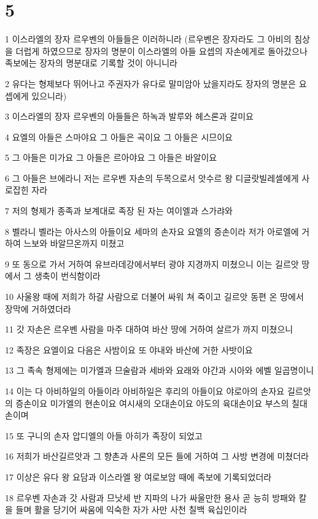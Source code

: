 \chapter{5}

\par 1 이스라엘의 장자 르우벤의 아들들은 이러하니라 (르우벤은 장자라도 그 아비의 침상을 더럽게 하였으므로 장자의 명분이 이스라엘의 아들 요셉의 자손에게로 돌아갔으나 족보에는 장자의 명분대로 기록할 것이 아니니라
\par 2 유다는 형제보다 뛰어나고 주권자가 유다로 말미암아 났을지라도 장자의 명분은 요셉에게 있으니라)
\par 3 이스라엘의 장자 르우벤의 아들들은 하녹과 발루와 헤스론과 갈미요
\par 4 요엘의 아들은 스마야요 그 아들은 곡이요 그 아들은 시므이요
\par 5 그 아들은 미가요 그 아들은 르아야요 그 아들은 바알이요
\par 6 그 아들은 브에라니 저는 르우벤 자손의 두목으로서 앗수르 왕 디글랏빌레셀에게 사로잡힌 자라
\par 7 저의 형제가 종족과 보계대로 족장 된 자는 여이엘과 스가랴와
\par 8 벨라니 벨라는 아사스의 아들이요 세마의 손자요 요엘의 증손이라 저가 아로엘에 거하여 느보와 바알므온까지 미쳤고
\par 9 또 동으로 가서 거하여 유브라데강에서부터 광야 지경까지 미쳤으니 이는 길르앗 땅에서 그 생축이 번식함이라
\par 10 사울왕 때에 저희가 하갈 사람으로 더불어 싸워 쳐 죽이고 길르앗 동편 온 땅에서 장막에 거하였더라
\par 11 갓 자손은 르우벤 사람을 마주 대하여 바산 땅에 거하여 살르가 까지 미쳤으니
\par 12 족장은 요엘이요 다음은 사밤이요 또 야내와 바산에 거한 사밧이요
\par 13 그 족속 형제에는 미가엘과 므술람과 세바와 요래와 야간과 시아와 에벨 일곱명이니
\par 14 이는 다 아비하일의 아들이라 아비하일은 후리의 아들이요 야로아의 손자요 길르앗의 증손이요 미가엘의 현손이요 여시새의 오대손이요 야도의 육대손이요 부스의 칠대손이며
\par 15 또 구니의 손자 압디엘의 아들 아히가 족장이 되었고
\par 16 저희가 바산길르앗과 그 향촌과 사론의 모든 들에 거하여 그 사방 변경에 미쳤더라
\par 17 이상은 유다 왕 요담과 이스라엘 왕 여로보암 때에 족보에 기록되었더라
\par 18 르우벤 자손과 갓 사람과 므낫세 반 지파의 나가 싸울만한 용사 곧 능히 방패와 칼을 들며 활을 당기어 싸움에 익숙한 자가 사만 사천 칠백 육십인이라
